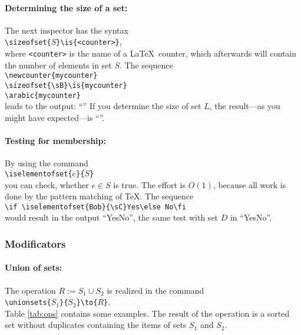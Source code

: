 \paragraph{Determining the size of a set:} The next inspector has the syntax\\
\mbox{}\hspace{2em}\verb$\sizeofset{$$S$\verb$}\is{<counter>}$,\\
where \texttt{<counter>} is the name of a \LaTeX\ counter, which afterwards will contain the number of elements in set $S$. The sequence\\
\mbox{}\hspace{2em}\verb$\newcounter{mycounter}$\\
\mbox{}\hspace{2em}\verb$\sizeofset{\sB}\is{mycounter}$\sizeofset{\sB}\\
\mbox{}\hspace{2em}\verb$\arabic{mycounter}$\\
leads to the output: ``''
If you determine the size of set $L$, the result\sizeofset{\sL}---as you might have expected---is ``''.

\paragraph{Testing for membership:}By using the command\\
\mbox{}\hspace{2em}\verb$\iselementofset{$$e$\verb$}{$$S$\verb$}$\\
you can check, whether $e \in S$ is true. The effort is $O(1)$, because all work is done by the pattern matching of \TeX. The sequence\\
\mbox{}\hspace{2em}\verb$\if \iselementofset{Bob}{\sC}Yes\else No\fi$\\
would result in the output ``\if {}Yes\else No\fi'', the same test with set $D$ in ``\if {}Yes\else No\fi''.

\subsubsection{Modificators}\label{modificators}

\paragraph{Union of sets:}The operation $R := S_1 \cup S_2$ is realized in the command\\
\mbox{}\hspace{2em}\verb|\unionsets{|$S_1$\verb|}{|$S_2$\verb|}\to{|$R$\verb|}|.\\
Table \ref{tab:ops} contains some examples. The result of the operation is a sorted set without duplicates containing the items of sets $S_1$ and $S_2$.

